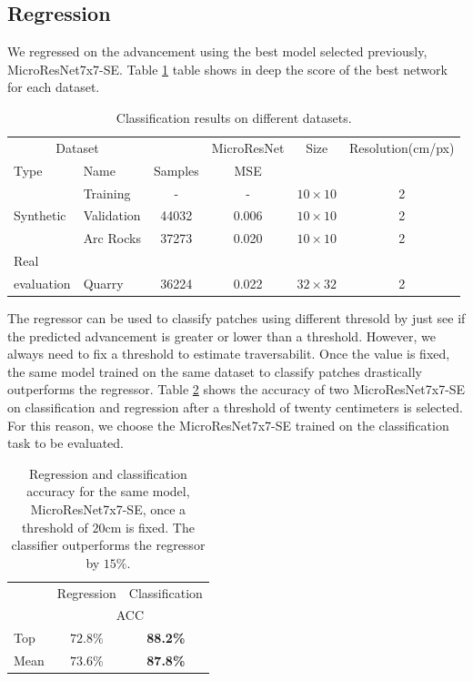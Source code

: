 \documentclass[../document.tex]{subfiles}
\begin{document}
\subsection{Regression}
We regressed on the advancement using the best model selected previously, MicroResNet7x7-SE. Table \ref{tab : regression-results} table shows in deep the score of the best network for each dataset.
\begin{table}[htbp]
    \centering
    \begin{tabular}{@{}llcccc@{}}
    \toprule
    \multicolumn{2}{c}{Dataset} & & \multicolumn{1}{c}{MicroResNet} & Size & Resolution(cm/px) \\
    \cmidrule{1-2} \cmidrule{4-5}
    Type     &  Name  & Samples & MSE      & \\
    \toprule
      \multirow{3}{*}{Synthetic}  & Training  &  - & - &$10\times10$  & 2\\
      &  Validation   & 44032 &  0.006  &  $10\times10$ & 2 \\
      & Arc Rocks & 37273 & 0.020  &  $10\times10$& 2 \\
      \cmidrule{2-6}
    Real\\evaluation & Quarry & 36224 &  0.022 & $32\times32$ & 2\\
    \bottomrule   
\end{tabular}
\caption{Classification results on different datasets.}
\label{tab : regression-results}
\end{table}
The regressor can be used to classify patches using different thresold by just see if the predicted advancement is greater or lower than a threshold. However, we always need to fix a threshold to estimate traversabilit. Once the value is fixed, the same model trained on the same dataset to classify patches drastically outperforms the regressor. Table \ref{tab : reg-clas} shows the accuracy of two MicroResNet7x7-SE on classification and regression after a threshold of twenty centimeters is selected. For this reason, we choose the MicroResNet7x7-SE trained on the classification task to be evaluated.
\begin{table}[htbp]
  \centering
  \begin{tabular}{@{}lcc@{}}
  \toprule
  &  Regression & Classification  \\
 & \multicolumn{2}{c}{ACC} \\ 
  \cline{2-3}
   Top & $72.8\%$ & \textbf{88.2\%} \\
   Mean & $73.6\%$ & \textbf{87.8\%} \\
  \bottomrule   
\end{tabular}
\caption{Regression and classification accuracy for the same model,  MicroResNet7x7-SE, once a threshold of $20$cm is fixed. The classifier outperforms the regressor by $15\%$.}
\label{tab : reg-clas}
\end{table}
\end{document}
